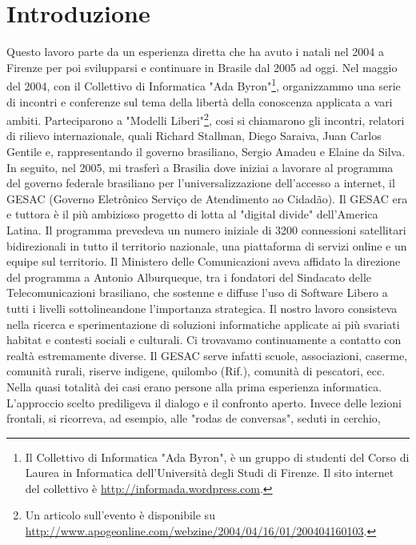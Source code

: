 
\chapter{Introduzione}
\label{Capitolo1}

Questo lavoro parte da un esperienza diretta che ha avuto i natali nel
2004 a Firenze per poi svilupparsi e continuare in Brasile dal 2005 ad
oggi. Nel maggio del 2004, con il Collettivo di Informatica "Ada
Byron"\footnote{Il Collettivo di Informatica "Ada Byron", è un gruppo
  di studenti del Corso di Laurea in Informatica dell’Università degli
  Studi di Firenze. Il sito internet del collettivo è
  \url{http://informada.wordpress.com}.}, organizzammo una serie di
incontri e conferenze sul tema della libertà della conoscenza
applicata a vari ambiti. Parteciparono a "Modelli Liberi"\footnote{Un
  articolo sull'evento è disponibile su
  \url{http://www.apogeonline.com/webzine/2004/04/16/01/200404160103}.},
cosi si chiamarono gli incontri, relatori di rilievo internazionale,
quali Richard Stallman, Diego Saraiva, Juan Carlos Gentile e,
rappresentando il governo brasiliano, Sergio Amadeu e Elaine da
Silva. In seguito, nel 2005, mi trasferì a Brasilia dove iniziai a
lavorare al programma del governo federale brasiliano per
l'universalizzazione dell'accesso a internet, il GESAC (Governo
Eletrônico Serviço de Atendimento ao Cidadão). Il GESAC era e tuttora
è il più ambizioso progetto di lotta al "digital divide" dell'America
Latina. Il programma prevedeva un numero iniziale di 3200 connessioni
satellitari bidirezionali in tutto il territorio nazionale, una
piattaforma di servizi online e un equipe sul territorio. Il Ministero
delle Comunicazioni aveva affidato la direzione del programma a
Antonio Alburqueque, tra i fondatori del Sindacato delle
Telecomunicazioni brasiliano, che sostenne e diffuse l'uso di Software
Libero a tutti i livelli sottolineandone l'importanza strategica. Il
nostro lavoro consisteva nella ricerca e sperimentazione di soluzioni
informatiche applicate ai più svariati habitat e contesti sociali e
culturali. Ci trovavamo continuamente a contatto con realtà
estremamente diverse. Il GESAC serve infatti scuole, associazioni,
caserme, comunità rurali, riserve indigene, quilombo (Rif.), comunità
di pescatori, ecc. Nella quasi totalità dei casi erano persone alla
prima esperienza informatica. L'approccio scelto prediligeva il
dialogo e il confronto aperto. Invece delle lezioni frontali, si
ricorreva, ad esempio, alle "rodas de conversas", seduti in cerchio,
